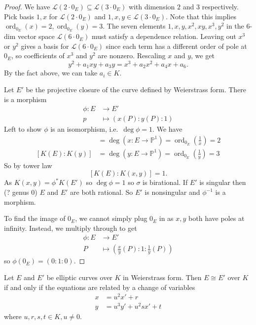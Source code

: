 \documentclass[a4paper]{article}
\theoremstyle{definition}
\theoremstyle{theorem}
\renewcommand*{\P}{\mathbb{P}}
\DeclareMathOperator{\ord}{ord}
\begin{document}
\begin{proof}
  We have \(\mathcal L(2 \cdot 0_E) \subseteq \mathcal L(3 \cdot 0_E)\) with dimension \(2\) and \(3\) respectively. Pick basis \(1, x\) for \(\mathcal L(2 \cdot 0_E)\) and \(1, x, y \in \mathcal L(3 \cdot 0_E)\). Note that this implies \(\ord_{0_E}(x) = 2, \ord_{0_E}(y) = 3\). The seven elements \(1, x, y, x^2, xy, x^3, y^2\) in the \(6\)-dim vector space \(\mathcal L(6 \cdot 0_E)\) must satisfy a dependence relation. Leaving out \(x^3\) or \(y^2\) gives a basis for \(\mathcal L(6 \cdot 0_E)\) since each term has a different order of pole at \(0_E\), so coefficients of \(x^3\) and \(y^2\) are nonzero. Rescaling \(x\) and \(y\), we get
  \[
    y^2 + a_1 xy + a_3 y = x^3 + a_2 x^2 + a_4 x + a_6.
  \]
  By the fact above, we can take \(a_i \in K\).

  Let \(E'\) be the projective closure of the curve defined by Weierstrass form. There is a morphism
  \begin{align*}
    \phi: E &\to E' \\
    p &\mapsto (x(P) : y(P) : 1)
  \end{align*}
  Left to show \(\phi\) is an isomorphism, i.e.\ \(\deg \phi = 1\). We have
  \begin{align*}
    [K(E) : K(x)] &= \deg (x: E \to \P^1) = \ord_{0_E}(\frac{1}{x}) = 2 \\
    [K(E) : K(y)] &= \deg (y: E \to \P^1) = \ord_{0_E}(\frac{1}{y}) = 3
  \end{align*}
  So by tower law
  \[
    [K(E): K(x, y)] = 1.
  \]
  As \(K(x, y) = \phi^* K(E')\) so \(\deg \phi = 1\) so \(\sigma\) is birational. If \(E'\) is singular then (? genus 0) \(E\) and \(E'\) are both rational. So \(E'\) is nonsingular and \(\phi^{-1}\) is a morphism.

  To find the image of \(0_E\), we cannot simply plug \(0_E\) in as \(x, y\) both have poles at infinity. Instead, we multiply through to get
  \begin{align*}
    \phi: E &\to E' \\
    P &\mapsto (\frac{x}{y} (P) : 1 : \frac{1}{y} (P))
  \end{align*}
  so \(\phi(0_E) = (0 : 1 : 0)\).
\end{proof}

\begin{proposition}
  Let \(E\) and \(E'\) be elliptic curves over \(K\) in Weierstrass form. Then \(E \cong E'\) over \(K\) if and only if the equations are related by a change of variables
  \begin{align*}
    x &= u^2 x' + r \\
    y &= u^3 y' + u^2 s x' + t
  \end{align*}
  where \(u, r, s, t \in K, u \neq 0\).
\end{proposition}
\end{document}
